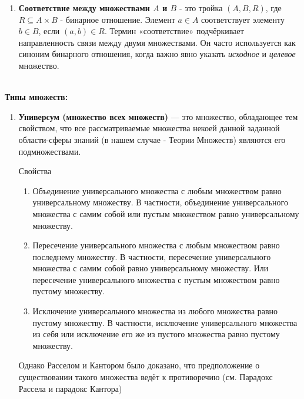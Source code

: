\documentclass{book}
\begin{document}
\begin{enumerate}[label=\arabic*., parsep=4pt, itemsep=4pt, topsep=4pt, partopsep=0pt]
\item \textbf{Соответствие между множествами $A$ и $B$} - это тройка $(A, B, R)$, где $R \subseteq A \times B$ - бинарное отношение. Элемент $a \in A$ соответствует элементу $b \in B$, если $(a,b) \in R$. Термин «соответствие» подчёркивает направленность связи между двумя множествами. Он часто используется как синоним бинарного отношения, когда важно явно указать \textit{исходное} и \textit{целевое} множество.

\end{enumerate}

$ $\\

\textbf{Типы множеств:}\\

\begin{enumerate}[label=\arabic*., parsep=4pt, itemsep=4pt, topsep=4pt, partopsep=0pt]

\item \textbf{Универсум (множество всех множеств)} — это множество, обладающее тем свойством, что все рассматриваемые множества некоей данной заданной области-сферы знаний (в нашем случае - Теории Множеств) являются его подмножествами.

Свойства

\begin{enumerate}[label=\arabic*., parsep=4pt, itemsep=4pt, topsep=4pt, partopsep=0pt]

\item Объединение универсального множества с любым множеством равно универсальному множеству. В частности, объединение универсального множества с самим собой или пустым множеством равно универсальному множеству.

\item Пересечение универсального множества с любым множеством равно последнему множеству. В частности, пересечение универсального множества с самим собой равно универсальному множеству. Или пересечение универсального множества с пустым множеством равно пустому множеству.

\item Исключение универсального множества из любого множества равно пустому множеству. В частности, исключение универсального множества из себя или исключение его же из пустого множества равно пустому множеству.

\end{enumerate}

Однако Расселом и Кантором было доказано, что предположение о существовании такого множества ведёт к противоречию (см. Парадокс Рассела и парадокс Кантора)


\end{enumerate}
\end{document}
